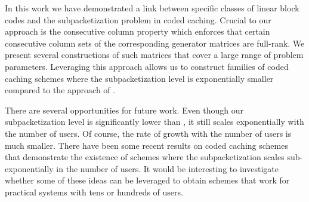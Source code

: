 \documentclass[journal,twocolumn]{IEEEtran}
\theoremstyle{definition}
\begin{document}
In this work we have demonstrated a link between specific classes of linear block codes and the subpacketization problem in coded caching. Crucial to our approach is the consecutive column property which enforces that certain consecutive column sets of the corresponding generator matrices are full-rank. We present several constructions of such matrices that cover a large range of problem parameters. Leveraging this approach allows us to construct families of coded caching schemes where the subpacketization level is exponentially smaller compared to the approach of \cite{maddahN14}.

There are several opportunities for future work. Even though our subpacketization level is significantly lower than \cite{maddahN14}, it still scales exponentially with the number of users. Of course, the rate of growth with the number of users is much smaller. There have been some recent results on coded caching schemes that demonstrate the existence of schemes where the subpacketization scales sub-exponentially in the number of users. It would be interesting to investigate whether some of these ideas can be leveraged to obtain schemes that work for practical systems with tens or hundreds of users.%

%
%
\end{document}
